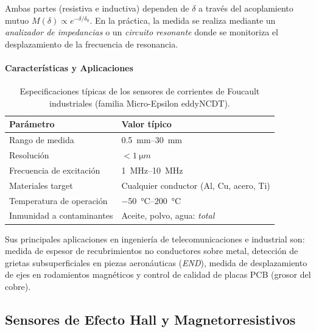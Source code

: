 Ambas partes (resistiva e inductiva) dependen de $\delta$ a través del acoplamiento mutuo $M(\delta) \propto e^{-\delta/\delta_0}$. En la práctica, la medida se realiza mediante un \emph{analizador de impedancias} o un \emph{circuito resonante} donde se monitoriza el desplazamiento de la frecuencia de resonancia.

\paragraph{Características y Aplicaciones}

\begin{table}[ht]
    \centering
    \caption[Especificaciones típicas de sensores de corrientes de Foucault.]{Especificaciones típicas de los sensores de corrientes de Foucault industriales (familia Micro-Epsilon eddyNCDT).\protect\label{tab:eddy_specs}}
    \begin{tabularx}{\linewidth}{M{2cm} X}
        \toprule
        \textbf{Parámetro} & \textbf{Valor típico} \\
        \midrule
        Rango de medida & \qtyrange{0.5}{30}{mm} \\
        Resolución & $<\qty{1}{\micro m}$ \\
        Frecuencia de excitación & \qtyrange{1}{10}{MHz} \\
        Materiales target & Cualquier conductor (Al, Cu, acero, Ti) \\
        Temperatura de operación & \qtyrange{-50}{200}{\degreeCelsius} \\
        Inmunidad a contaminantes & Aceite, polvo, agua: \emph{total} \\
        \bottomrule
    \end{tabularx}
\end{table}

Sus principales aplicaciones en ingeniería de telecomunicaciones e industrial son: medida de espesor de recubrimientos no conductores sobre metal, detección de grietas subsuperficiales en piezas aeronáuticas (\emph{END}), medida de desplazamiento de ejes en rodamientos magnéticos y control de calidad de placas PCB (grosor del cobre).

\subsection{Sensores de Efecto Hall y Magnetorresistivos}\label{sub:hall_mr}

